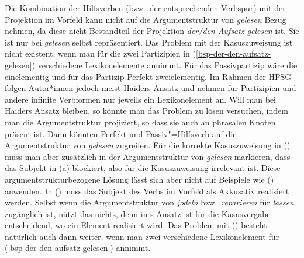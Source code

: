 Die Kombination der Hilfsverben (bzw.\ der entsprechenden Verbspur)
mit der Projektion im Vorfeld kann nicht auf die Argumentstruktur von
\emph{gelesen} Bezug nehmen, da diese nicht Bestandteil der Projektion
\emph{der/den Aufsatz gelesen} ist. Sie ist nur bei \emph{gelesen} selbst repräsentiert. Das Problem
mit der Kasuszuweisung ist nicht existent, wenn man für die zwei Partizipien in
(\ref{bsp-der-den-aufsatz-gelesen}) verschiedene Lexikonelemente annimmt. Für das Passivpartizip
wäre die \argstl einelementig und für das Partizip Perfekt zweielementig. Im Rahmen der HPSG folgen
Autor*innen jedoch meist Haiders Ansatz und nehmen für Partizipien und andere infinite Verbformen
nur jeweils ein Lexikonelement an. Will man bei Haiders Ansatz bleiben, so könnte man das Problem zu
lösen versuchen, indem man die Argumentstruktur 
projiziert, so dass sie auch an phrasalen Knoten präsent ist. 
Dann könnten Perfekt
und Passiv"=Hilfsverb auf die Argumentstruktur von \emph{gelesen} zugreifen.
Für die korrekte Kasuszuweisung in () muss man aber zusätzlich
in der Argumentstruktur von \emph{gelesen} markieren, dass das Subjekt
in (a) blockiert, also für die Kasuszuweisung irrelevant ist.
Diese argumentstrukturbezogene Lösung lässt sich aber nicht auf Beispiele
wie () anwenden. In () muss das Subjekt des Verbs im Vorfeld
als Akkusativ realisiert werden.
\eal
\label{bsp-den-saenger-jodeln}
\zl
Selbst wenn die Argumentstruktur von \emph{jodeln} bzw.\ \emph{reparieren}
für \emph{lassen} zugänglich ist, nützt das nichts, denn in \prz{}s
Ansatz ist für die Kasusvergabe entscheidend, wo ein Element realisiert wird. Das Problem mit
() besteht natürlich auch dann weiter, wenn man zwei verschiedene Lexikonelement für
(\ref{bsp-der-den-aufsatz-gelesen}) annimmt.

